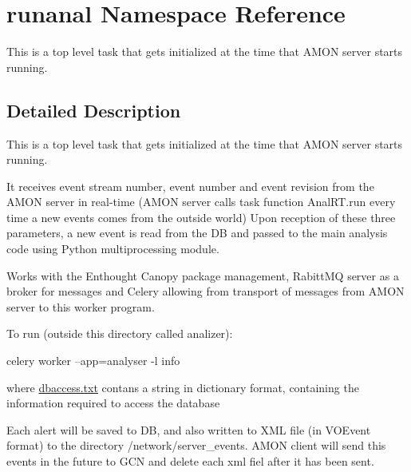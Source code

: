 \hypertarget{namespacerunanal}{\section{runanal Namespace Reference}
\label{namespacerunanal}
}


\begin{DoxyVerb} This is a top level task that gets initialized
 at the time that AMON server starts running.\end{DoxyVerb}
  




\subsection{Detailed Description}
\begin{DoxyVerb} This is a top level task that gets initialized
 at the time that AMON server starts running.\end{DoxyVerb}
 It receives event stream number, event number and event revision from the A\-M\-O\-N server in real-\/time (A\-M\-O\-N server calls task function Anal\-R\-T.\-run every time a new events comes from the outside world) Upon reception of these three parameters, a new event is read from the D\-B and passed to the main analysis code using Python multiprocessing module.

Works with the Enthought Canopy package management, Rabitt\-M\-Q server as a broker for messages and Celery allowing from transport of messages from A\-M\-O\-N server to this worker program.

To run (outside this directory called analizer)\-:

celery worker --app=analyser -\/l info

where \hyperlink{dbaccess_8txt}{dbaccess.\-txt} contans a string in dictionary format, containing the information required to access the database

Each alert will be saved to D\-B, and also written to X\-M\-L file (in V\-O\-Event format) to the directory /network/server\-\_\-events. A\-M\-O\-N client will send this events in the future to G\-C\-N and delete each xml fiel after it has been sent. 